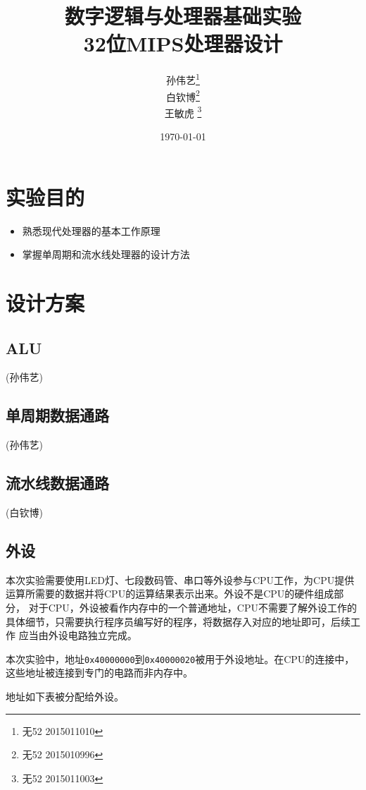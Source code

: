 \documentclass{ctexart}
\begin{document}
	\title{数字逻辑与处理器基础实验 \\ 32位MIPS处理器设计}
	\author{孙伟艺\thanks{无52 2015011010}\\ 白钦博\thanks{无52 2015010996} \\ 王敏虎 \thanks{无52 2015011003}}
	\date{\today}
	\maketitle
	\clearpage

	\section{实验目的}
	\begin{itemize}
		\item 熟悉现代处理器的基本工作原理
		\item 掌握单周期和流水线处理器的设计方法
	\end{itemize}

	\section{设计方案}
		\subsection{ALU}
			(孙伟艺)
		\subsection{单周期数据通路}
			(孙伟艺)
		\subsection{流水线数据通路}
			(白钦博)
		\subsection{外设}
		本次实验需要使用LED灯、七段数码管、串口等外设参与CPU工作，为CPU提供运算所需要的数据并将CPU的运算结果表示出来。外设不是CPU的硬件组成部分，
		对于CPU，外设被看作内存中的一个普通地址，CPU不需要了解外设工作的具体细节，只需要执行程序员编写好的程序，将数据存入对应的地址即可，后续工作
		应当由外设电路独立完成。

		本次实验中，地址\verb"0x40000000"到\verb"0x40000020"被用于外设地址。在CPU的连接中，这些地址被连接到专门的电路而非内存中。

		地址如下表被分配给外设。
\end{document}
